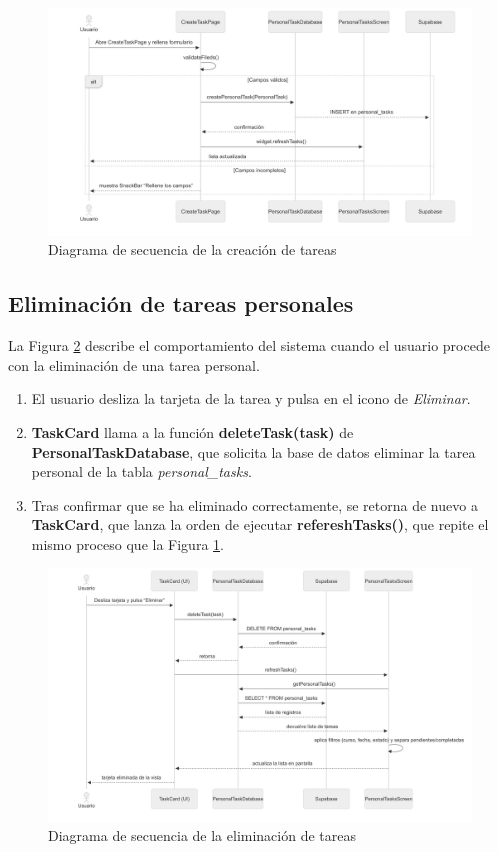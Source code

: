 \begin{figure}[p]
    \centering
    \includegraphics[width=1.0\linewidth]{img/secuencia_creacion_tareas.png}
    \caption{Diagrama de secuencia de la creación de tareas}
    \label{fig:secuencia_creacion_tareas}
\end{figure}

\subsection{Eliminación de tareas personales}
La Figura \ref{fig:secuencia_eliminar_tarea} describe el comportamiento del sistema cuando el usuario procede con la eliminación de una tarea personal.

\begin{enumerate}
    \item El usuario desliza la tarjeta de la tarea y pulsa en el icono de \textit{Eliminar}.
    \item \textbf{TaskCard} llama a la función \textbf{deleteTask(task)} de \textbf{PersonalTaskDatabase}, que solicita la base de datos eliminar la tarea personal de la tabla \textit{personal\_tasks}.
    \item Tras confirmar que se ha eliminado correctamente, se retorna de nuevo a \textbf{TaskCard}, que lanza la orden de ejecutar \textbf{refereshTasks()}, que repite el mismo proceso que la Figura \ref{fig:secuencia_creacion_tareas}.
\end{enumerate}

\begin{figure}[p]
    \centering
    \includegraphics[width=1.0\linewidth]{img/secuencia_eliminar_tarea.png}
    \caption{Diagrama de secuencia de la eliminación de tareas}
    \label{fig:secuencia_eliminar_tarea}
\end{figure}